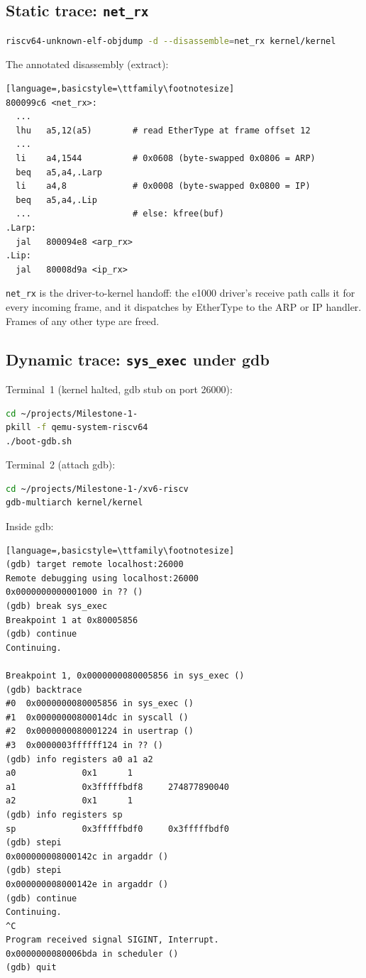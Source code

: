 \documentclass[11pt,a4paper]{article}
\begin{document}
\subsection{Static trace: \texttt{net\_rx}}

\begin{lstlisting}[language=bash]
riscv64-unknown-elf-objdump -d --disassemble=net_rx kernel/kernel
\end{lstlisting}

The annotated disassembly (extract):

\begin{lstlisting}[language=,basicstyle=\ttfamily\footnotesize]
800099c6 <net_rx>:
  ...
  lhu   a5,12(a5)        # read EtherType at frame offset 12
  ...
  li    a4,1544          # 0x0608 (byte-swapped 0x0806 = ARP)
  beq   a5,a4,.Larp
  li    a4,8             # 0x0008 (byte-swapped 0x0800 = IP)
  beq   a5,a4,.Lip
  ...                    # else: kfree(buf)
.Larp:
  jal   800094e8 <arp_rx>
.Lip:
  jal   80008d9a <ip_rx>
\end{lstlisting}

\texttt{net\_rx} is the driver-to-kernel handoff: the e1000 driver's receive path calls it for every incoming frame, and it dispatches by EtherType to the ARP or IP handler. Frames of any other type are freed.

\subsection{Dynamic trace: \texttt{sys\_exec} under gdb}

Terminal~1 (kernel halted, gdb stub on port 26000):
\begin{lstlisting}[language=bash]
cd ~/projects/Milestone-1-
pkill -f qemu-system-riscv64
./boot-gdb.sh
\end{lstlisting}

Terminal~2 (attach gdb):
\begin{lstlisting}[language=bash]
cd ~/projects/Milestone-1-/xv6-riscv
gdb-multiarch kernel/kernel
\end{lstlisting}

Inside gdb:
\begin{lstlisting}[language=,basicstyle=\ttfamily\footnotesize]
(gdb) target remote localhost:26000
Remote debugging using localhost:26000
0x0000000000001000 in ?? ()
(gdb) break sys_exec
Breakpoint 1 at 0x80005856
(gdb) continue
Continuing.

Breakpoint 1, 0x0000000080005856 in sys_exec ()
(gdb) backtrace
#0  0x0000000080005856 in sys_exec ()
#1  0x00000000800014dc in syscall ()
#2  0x0000000080001224 in usertrap ()
#3  0x0000003ffffff124 in ?? ()
(gdb) info registers a0 a1 a2
a0             0x1      1
a1             0x3fffffbdf8     274877890040
a2             0x1      1
(gdb) info registers sp
sp             0x3fffffbdf0     0x3fffffbdf0
(gdb) stepi
0x000000008000142c in argaddr ()
(gdb) stepi
0x000000008000142e in argaddr ()
(gdb) continue
Continuing.
^C
Program received signal SIGINT, Interrupt.
0x0000000080006bda in scheduler ()
(gdb) quit
\end{lstlisting}
\end{document}
